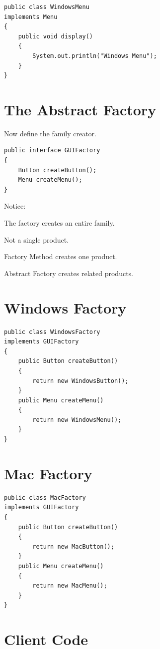 \documentclass[11pt,a4paper]{book}
\begin{document}
\begin{verbatim}
public class WindowsMenu
implements Menu
{
    public void display()
    {
        System.out.println("Windows Menu");
    }
}
\end{verbatim}
\section{The Abstract Factory}

Now define the family creator.

\begin{verbatim}
public interface GUIFactory
{
    Button createButton();
    Menu createMenu();
}
\end{verbatim}

Notice:

The factory creates an entire family.

Not a single product.

\begin{rosettarule}

Factory Method creates one product.

Abstract Factory creates related products.

\end{rosettarule}
\section{Windows Factory}

\begin{verbatim}
public class WindowsFactory
implements GUIFactory
{
    public Button createButton()
    {
        return new WindowsButton();
    }
    public Menu createMenu()
    {
        return new WindowsMenu();
    }
}
\end{verbatim}
\section{Mac Factory}

\begin{verbatim}
public class MacFactory
implements GUIFactory
{
    public Button createButton()
    {
        return new MacButton();
    }
    public Menu createMenu()
    {
        return new MacMenu();
    }
}
\end{verbatim}
\section{Client Code}
\end{document}
